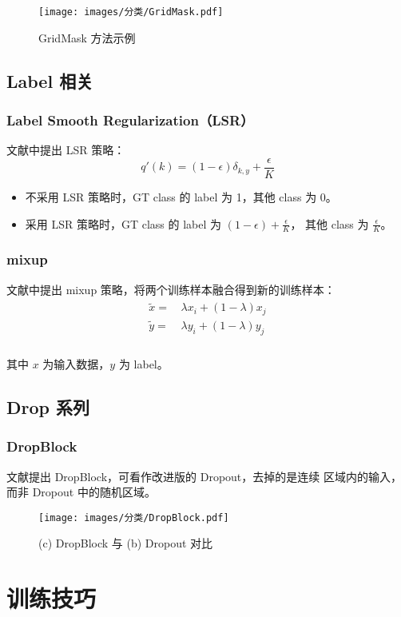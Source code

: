 \begin{figure}[ht]
  \centering
  \texttt{[image: images/分类/GridMask.pdf]}
  \caption{GridMask 方法示例}\label{fig:gridmask}
\end{figure}

\subsection{Label 相关}
\subsubsection{Label Smooth Regularization（LSR）}
文献中提出 LSR 策略：
\begin{equation}
  q'(k) = (1-\epsilon) \delta_{k,y} + \frac{\epsilon}{K}
\end{equation}

\begin{itemize}
  \item 不采用 LSR 策略时，GT class 的 label 为 1，其他 class 为 0。
  \item 采用 LSR 策略时，GT class 的 label 为 $(1-\epsilon) + \frac{\epsilon}{K}$，
    其他 class 为 $\frac{\epsilon}{K}$。
\end{itemize}

\subsubsection{mixup}
文献中提出 mixup 策略，将两个训练样本融合得到新的训练样本：
\begin{align}
  \begin{split}
    \tilde{x} = & \, \lambda x_i + (1-\lambda) x_j  \\
    \tilde{y} = & \, \lambda y_i + (1-\lambda) y_j  \\
  \end{split}
\end{align}

其中 $x$ 为输入数据，$y$ 为 label。

\subsection{Drop 系列}
\subsubsection{DropBlock}
文献提出 DropBlock，可看作改进版的 Dropout，去掉的是连续
区域内的输入，而非 Dropout 中的随机区域。

\begin{figure}[ht]
  \centering
  \texttt{[image: images/分类/DropBlock.pdf]}
  \caption{(c) DropBlock 与 (b) Dropout 对比}\label{fig:dropblock}
\end{figure}

\section{训练技巧}


